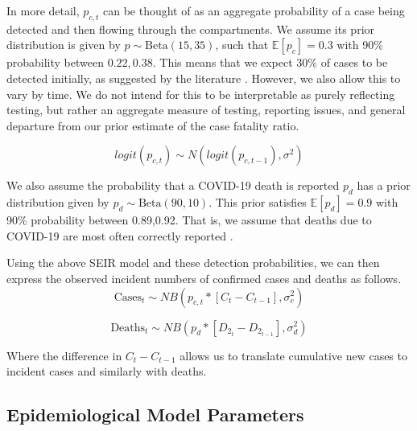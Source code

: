 \documentclass[11pt]{amsart}
\newcommand{\Beta}{\text{Beta}}
\newcommand{\E}{\mathbb{E}}
\begin{document}
In more detail, $p_{c,t}$ can be thought of as an aggregate probability of a case being detected and then flowing through the compartments. We assume its prior distribution is given by  $p \sim \Beta(15, 35)$, such that  $\E[p_c] = 0.3$  with 90\% probability between $0.22,0.38$. This means that we expect 30\% of cases to be detected initially, as suggested by the literature \cite{midas}. However, we also allow this to vary by time. We do not intend for this to be interpretable as purely reflecting testing, but rather an aggregate measure of testing, reporting issues, and general departure from our prior estimate of the case fatality ratio.

\begin{equation}
logit(p_{c,t}) \sim N(logit(p_{c,t-1}), \sigma^2)
\end{equation}

We also assume the probability that a COVID-19 death is reported $p_d$ has a prior distribution given by  $p_d \sim \Beta(90, 10)$. This prior satisfies $\E[p_d] = 0.9$ with 90\% probability between 0.89,0.92. That is, we assume that deaths due to COVID-19 are most often correctly reported \cite{weinberger2020estimation}. 

 


Using the above SEIR model and these detection probabilities, we can then express the observed incident numbers of confirmed cases and deaths as follows.
\begin{equation}
\text{Cases}_{t} \sim NB(p_{c,t}*[C_{t} - C_{t-1}],\sigma_{c}^2)
\end{equation}

\begin{equation}
\text{Deaths}_{t} \sim NB(p_d*[D_{2_{t}} - D_{2_{t-1}}], \sigma_d^2)
\end{equation}

Where the difference in $C_{t}-C_{t-1}$ allows us to translate cumulative new cases to incident cases and similarly with deaths. 
%

\subsection{Epidemiological Model Parameters}
\end{document}
